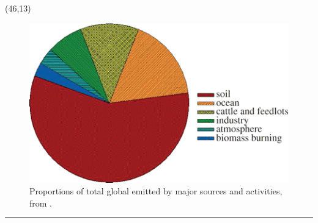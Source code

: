 \documentclass{a0poster} %
\renewcommand{\large}{\fontsize{35.83}{45}\selectfont}
\def\Subhead#1{\noindent\hbox {{\large\color{DarkBlue} #1}\hfil}\bigskip}
\begin{document}
\begin{textblock}{30}(46,13)



\begin{figure}[h!] %
  \centering
    \includegraphics[scale=2]{Thomson_et_al_2012__F1_medium}
    \caption{Proportions of total global  emitted by major sources and activities, from \citet{thomson_biological_2012}.}
\end{figure}

\vspace{-20mm}\rule{\textwidth}{1pt}


\end{textblock}
\end{document}
